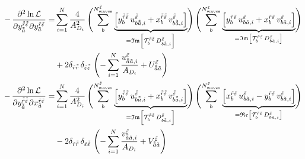 \begin{align}
  \label{eq:likelihood_function_im_im_deriv}
  \begin{split}
  -\dmd{\ln \mathcal{L}}{2}{{y_{\doubletilde{a}}^{\doubletilde{r} \doubletilde{\refl}}}}{}{{y_{\tilde{a}}^{\tilde{r} \tilde{\refl}}}}{}
  = &\sum_{i = 1}^{N} \frac{4}{A_{D_i}^2}
  \rBrk[4]{\sum_b^{N^{\doubletilde{\refl}}_\text{waves}}
  \underbrace{\sBrk{y_b^{\doubletilde{r} \doubletilde{\refl}}\, u^{\doubletilde{\refl}}_{b \doubletilde{a}, i}
    + x_b^{\doubletilde{r} \doubletilde{\refl}}\, v^{\doubletilde{\refl}}_{b \doubletilde{a}, i}}}_{%
     = \Im\sBrk{\mathcal{T}_b^{\doubletilde{r} \doubletilde{\refl}}\, D^{\doubletilde{\refl}}_{b \doubletilde{a}, i}}}}
  \rBrk[4]{\sum_b^{N^{\tilde{\refl}}_\text{waves}}
  \underbrace{\sBrk{y_b^{\tilde{r} \tilde{\refl}}\, u^{\tilde{\refl}}_{b \tilde{a}, i}
    + x_b^{\tilde{r} \tilde{\refl}}\, v^{\tilde{\refl}}_{b \tilde{a}, i}}}_{%
    = \Im\sBrk{\mathcal{T}_b^{\tilde{r} \tilde{\refl}}\, D^{\tilde{\refl}}_{b \tilde{a}, i}}}} \\
  &+ 2 \delta_{\tilde{r} \doubletilde{r}}\, \delta_{\tilde{\refl} \doubletilde{\refl}}\,
  \rBrk[4]{-\sum_{i = 1}^{N} \frac{u^{\tilde{\refl}}_{\doubletilde{a} \tilde{a}, i}}{A_{D_i}} + U^{\tilde{\refl}}_{\doubletilde{a} \tilde{a}}}
  \end{split} \\
  \label{eq:likelihood_function_re_im_deriv}
  \begin{split}
  -\dmd{\ln \mathcal{L}}{2}{{y_{\doubletilde{a}}^{\doubletilde{r} \doubletilde{\refl}}}}{}{{x_{\tilde{a}}^{\tilde{r} \tilde{\refl}}}}{}
  = &\sum_{i = 1}^{N} \frac{4}{A_{D_i}^2}
  \rBrk[4]{\sum_b^{N^{\doubletilde{\refl}}_\text{waves}}
  \underbrace{\sBrk{y_b^{\doubletilde{r} \doubletilde{\refl}}\, u^{\doubletilde{\refl}}_{b \doubletilde{a}, i}
    + x_b^{\doubletilde{r} \doubletilde{\refl}}\, v^{\doubletilde{\refl}}_{b \doubletilde{a}, i}}}_{%
     = \Im\sBrk{\mathcal{T}_b^{\doubletilde{r} \doubletilde{\refl}}\, D^{\doubletilde{\refl}}_{b \doubletilde{a}, i}}}}
  \rBrk[4]{\sum_b^{N^{\tilde{\refl}}_\text{waves}}
  \underbrace{\sBrk{x_b^{\tilde{r} \tilde{\refl}}\, u^{\tilde{\refl}}_{b \tilde{a}, i}
    - y_b^{\tilde{r} \tilde{\refl}}\, v^{\tilde{\refl}}_{b \tilde{a}, i}}}_{%
    = \Re\sBrk{\mathcal{T}_b^{\tilde{r} \tilde{\refl}}\, D^{\tilde{\refl}}_{b \tilde{a}, i}}}} \\
  &- 2 \delta_{\tilde{r} \doubletilde{r}}\, \delta_{\tilde{\refl} \doubletilde{\refl}}\,
  \rBrk[4]{-\sum_{i = 1}^{N} \frac{v^{\tilde{\refl}}_{\doubletilde{a} \tilde{a}, i}}{A_{D_i}} + V^{\tilde{\refl}}_{\doubletilde{a} \tilde{a}}}

\end{split}
\end{align}
